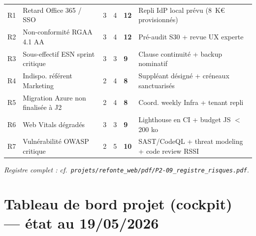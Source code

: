 \documentclass[11pt,a4paper,oneside]{report}
\begin{document}
\renewcommand{\arraystretch}{1.3}
\begin{tabularx}{\textwidth}{C{0.7cm} L{5cm} C{1cm} C{1cm} C{1.5cm} L{4.5cm}}
\toprule
{}\th{\#} &  &  &  &  &  \\
\midrule
R1 & Retard Office 365 / SSO            & 3 & 4 & \textbf{12} & Repli IdP local prévu (8~K€ provisionnés) \\
R2 & Non-conformité RGAA 4.1 AA         & 3 & 4 & \textbf{12} & Pré-audit S30 + revue UX experte \\
R3 & Sous-effectif ESN sprint critique  & 3 & 3 & \textbf{9}  & Clause continuité + backup nominatif \\
R4 & Indispo. référent Marketing        & 2 & 4 & \textbf{8}  & Suppléant désigné + créneaux sanctuarisés \\
R5 & Migration Azure non finalisée à J2 & 2 & 4 & \textbf{8}  & Coord. weekly Infra + tenant repli \\
R6 & Web Vitals dégradés                & 3 & 3 & \textbf{9}  & Lighthouse en CI + budget JS $<$ 200 ko \\
R7 & Vulnérabilité OWASP critique       & 2 & 5 & \textbf{10}    & SAST/CodeQL + threat modeling + code review RSSI \\
\bottomrule
\end{tabularx}

\textit{Registre complet : cf.\ \texttt{projets/refonte\_web/pdf/P2-09\_registre\_risques.pdf}.}

\section{Tableau de bord projet (cockpit) --- état au 19/05/2026}
\end{document}
